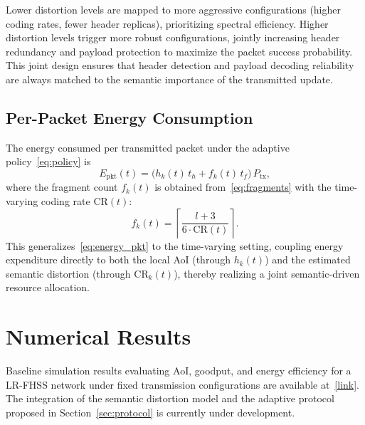 \documentclass[lettersize,journal]{IEEEtran}
\begin{document}
Lower distortion levels are mapped to more aggressive configurations (higher coding rates, fewer header replicas), prioritizing spectral efficiency. Higher distortion levels trigger more robust configurations, jointly increasing header redundancy and payload protection to maximize the packet success probability. This joint design ensures that header detection and payload decoding reliability are always matched to the semantic importance of the transmitted update.

\subsection{Per-Packet Energy Consumption}
\label{subsec:energy_protocol}

The energy consumed per transmitted packet under the adaptive policy~\eqref{eq:policy} is
\begin{equation}
    E_{\mathrm{pkt}}(t) =
      \bigl(h_k(t)\,t_h + f_k(t)\,t_f\bigr)\, P_{\mathrm{tx}},
    \label{eq:energy_adaptive}
\end{equation}
where the fragment count $f_k(t)$ is obtained from~\eqref{eq:fragments} with the time-varying coding rate $\mathrm{CR}(t)$:
\begin{equation}
    f_k(t) = \left\lceil \frac{l + 3}{6 \cdot \mathrm{CR}(t)} \right\rceil.
    \label{eq:fragments_adaptive}
\end{equation}
This generalizes~\eqref{eq:energy_pkt} to the time-varying setting, coupling energy expenditure directly to both the local \ac{AoI} (through $h_k(t)$) and the estimated semantic distortion (through $\mathrm{CR}_k(t)$), thereby realizing a joint semantic-driven resource allocation.

\section{Numerical Results}
\label{sec:results}

Baseline simulation results evaluating \ac{AoI}, goodput, and energy efficiency for a \ac{LR-FHSS} network under fixed transmission configurations are available at~\href{https://github.com/jamfarhat/LR-FHSS\_and\_SemanticCommunications}{[link]}. The integration of the semantic distortion model and the adaptive protocol proposed in Section~\ref{sec:protocol} is currently under development.




\end{document}

